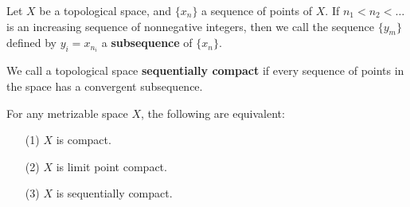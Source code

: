 \begin{definition}
    Let $X$ be a topological space, and  $\{x_n\}$ a sequence of points of $X$.
    If  $n_1<n_2<\dots$ is an increasing sequence of nonnegative integers, then
    we call the sequence $\{y_m\}$ defined by $y_i=x_{n_i}$ a
    \textbf{subsequence} of $\{x_n\}$.
\end{definition}

\begin{definition}
    We call a topological space \textbf{sequentially compact} if every sequence
    of points in the space has a convergent subsequence.
\end{definition}

\begin{theorem}\label{3.7.2}
    For any metrizable space $X$, the following are equivalent:
    \begin{enumerate}
        \item[(1)] $X$ is compact.

        \item[(2)] $X$ is limit point compact.

        \item[(3)] $X$ is sequentially compact.
    \end{enumerate}
\end{theorem}
